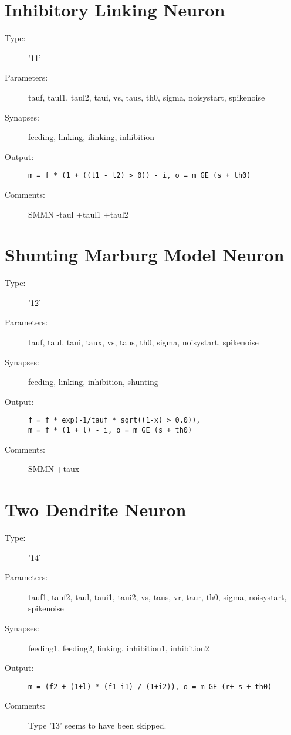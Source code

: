 \documentclass[12pt]{article}
\begin{document}
\section{Inhibitory Linking Neuron}
\begin{description}
\item[Type:] '11'

\item[Parameters:] tauf, taul1, taul2, taui, vs, taus, th0, sigma, noisystart, 
              spikenoise

\item[Synapses:] feeding, linking, ilinking, inhibition

\item[Output:] \texttt{m = f * (1 + ((l1 - l2) > 0)) - i, o = m GE (s + th0)}

\item[Comments:] SMMN -taul +taul1 +taul2 
\end{description}



\section{Shunting Marburg Model Neuron}
\begin{description}
\item[Type:] '12'

\item[Parameters:] tauf, taul, taui, taux, vs, taus, th0, sigma, noisystart, 
              spikenoise

\item[Synapses:] feeding, linking, inhibition, shunting

\item[Output:] \texttt{f = f * exp(-1/tauf * sqrt((1-x) > 0.0)),\\
 m = f * (1 + l) - i, o = m GE (s + th0)}

\item[Comments:] SMMN +taux 
\end{description}



\section{Two Dendrite Neuron}
\begin{description}
\item[Type:] '14'

\item[Parameters:] tauf1, tauf2, taul, taui1, taui2, vs, taus, vr,
                   taur, th0, sigma, noisystart, spikenoise

\item[Synapses:] feeding1, feeding2, linking, inhibition1, inhibition2

\item[Output:] \texttt{m = (f2 + (1+l) * (f1-i1) / (1+i2)), o = m GE (r+ s + th0)}

\item[Comments:] Type '13' seems to have been skipped.
\end{description}
\end{document}
